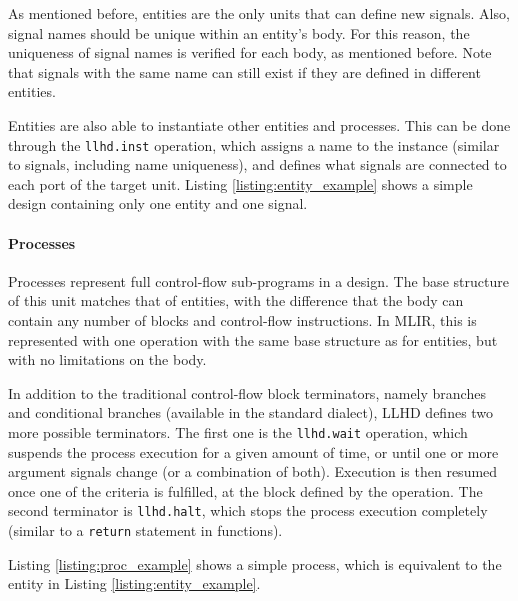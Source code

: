 As mentioned before, entities are the only units that can define new signals. Also, signal names should be unique within an entity's body. For this reason, the uniqueness of signal names is verified for each body, as mentioned before. Note that signals with the same name can still exist if they are defined in different entities.

Entities are also able to instantiate other entities and processes. This can be done through the \texttt{llhd.inst} operation, which assigns a name to the instance (similar to signals, including name uniqueness), and defines what signals are connected to each port of the target unit.
Listing \ref{listing:entity_example} shows a simple design containing only one entity and one signal.


\paragraph{Processes}
Processes represent full control-flow sub-programs in a design. The base structure of this unit matches that of entities, with the difference that the body can contain any number of blocks and control-flow instructions.
In MLIR, this is represented with one operation with the same base structure as for entities, but with no limitations on the body.

In addition to the traditional control-flow block terminators, namely branches and conditional branches (available in the standard dialect), LLHD defines two more possible terminators. The first one is the \texttt{llhd.wait} operation, which suspends the process execution for a given amount of time, or until one or more argument signals change (or a combination of both). Execution is then resumed once one of the criteria is fulfilled, at the block defined by the operation. The second terminator is \texttt{llhd.halt}, which stops the process execution completely (similar to a \texttt{return} statement in functions).

Listing \ref{listing:proc_example} shows a simple process, which is equivalent to the entity in Listing \ref{listing:entity_example}.


